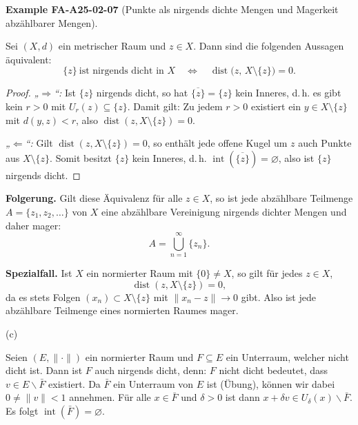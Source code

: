 \documentclass[10pt, letterpaper]{article}
\newcommand{\CustomHeading}[3]{%
  \par\medskip\noindent%
  \textbf{#1 #2} \textnormal{(#3)}.\enskip%
}
\newenvironment{EXA}[2]{\begin{unitbox}\CustomHeading{Example}{#1}{#2}}{\end{unitbox}}
\begin{document}
\begin{EXA}{FA-A25-02-07}{Punkte als nirgends dichte Mengen und Magerkeit abzählbarer Mengen}
Sei $(X,d)$ ein metrischer Raum und $z\in X$. Dann sind die folgenden Aussagen äquivalent:
\[
\{z\}\ \text{ist nirgends dicht in }X
\quad\Longleftrightarrow\quad
\operatorname{dist}\bigl(z,\,X\setminus\{z\}\bigr)=0.
\]

\begin{proof}
\emph{„$\Rightarrow$“:} Ist $\{z\}$ nirgends dicht, so hat $\overline{\{z\}}=\{z\}$ kein Inneres, d.\,h.
es gibt kein $r>0$ mit $U_r(z)\subseteq\{z\}$. Damit gilt: Zu jedem $r>0$ existiert ein $y\in X\setminus\{z\}$
mit $d(y,z)<r$, also $\operatorname{dist}(z,X\setminus\{z\})=0$.

\emph{„$\Leftarrow$“:} Gilt $\operatorname{dist}(z,X\setminus\{z\})=0$, so enthält jede offene Kugel um $z$
auch Punkte aus $X\setminus\{z\}$. Somit besitzt $\{z\}$ kein Inneres, d.\,h. $\operatorname{int}(\overline{\{z\}})=\varnothing$,
also ist $\{z\}$ nirgends dicht.
\end{proof}

\textbf{Folgerung.}  
Gilt diese Äquivalenz für alle $z\in X$, so ist jede abzählbare Teilmenge $A=\{z_1,z_2,\ldots\}$ von $X$
eine abzählbare Vereinigung nirgends dichter Mengen und daher mager:
\[
A=\bigcup_{n=1}^{\infty}\{z_n\}.
\]

\textbf{Spezialfall.}  
Ist $X$ ein normierter Raum mit $\{0\}\neq X$, so gilt für jedes $z\in X$,
\[
\operatorname{dist}(z, X\setminus\{z\})=0,
\]
da es stets Folgen $(x_n)\subset X\setminus\{z\}$ mit $\|x_n-z\|\to 0$ gibt.
Also ist jede abzählbare Teilmenge eines normierten Raumes mager.
\end{EXA}



(c) 

Seien $(E,\|\cdot\|)$ ein normierter Raum und $F \subseteq E$ ein Unterraum, welcher nicht dicht ist. Dann ist $F$ auch nirgends dicht, denn: $F$ nicht dicht bedeutet, dass $v \in E \backslash \bar{F}$ existiert. Da $\bar{F}$ ein Unterraum von $E$ ist (Übung), können wir dabei $0 \neq\|v\|<1$ annehmen. Für alle $x \in \bar{F}$ und $\delta>0$ ist dann $x+\delta v \in U_{\delta}(x) \backslash \bar{F}$. Es folgt $\operatorname{int}(\bar{F})=\varnothing$.
\end{document}
